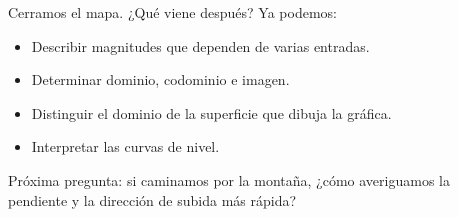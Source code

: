 \documentclass[main.tex]{subfiles}
\begin{document}
\begin{frame}{Cerramos el mapa. ¿Qué viene después?}
Ya podemos:
\begin{itemize}
\item Describir magnitudes que dependen de varias entradas.
\item Determinar dominio, codominio e imagen.
\item Distinguir el dominio de la superficie que dibuja la gráfica.
\item Interpretar las curvas de nivel.
\end{itemize}
\bigskip

\alert{Próxima pregunta:} si caminamos por la montaña, ¿cómo averiguamos la pendiente y la dirección de subida más rápida?
\end{frame}
\end{document}
